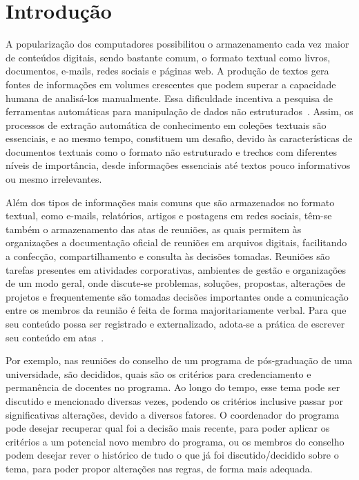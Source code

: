 \chapter{Introdução}\label{cap1}

\let\cleardoublepage\clearpage

A popularização dos computadores possibilitou o armazenamento cada vez maior de conteúdos digitais, sendo bastante comum, o formato textual como livros, documentos, e-mails, redes sociais e páginas web. A produção de textos gera fontes de informações em volumes crescentes que podem superar a capacidade humana de analisá-los manualmente. Essa dificuldade incentiva a pesquisa de ferramentas automáticas para manipulação de dados não estruturados~\cite{Cao:2017, Manning2008}. 
Assim, os processos de extração automática de conhecimento em coleções textuais são essenciais, e ao mesmo tempo, constituem um desafio, devido às características de documentos textuais como o formato não estruturado e trechos com diferentes níveis de importância, desde informações essenciais até textos pouco informativos ou mesmo irrelevantes. 

Além dos tipos de informações mais comuns que são armazenados no formato textual, como e-mails, relatórios, artigos e postagens em redes sociais, têm-se também o armazenamento das atas de reuniões, as quais permitem às organizações a documentação oficial de reuniões em arquivos digitais, facilitando a confecção, compartilhamento e consulta às decisões tomadas.
% 
% 
% 
Reuniões são tarefas presentes em atividades corporativas, ambientes de gestão e organizações de um modo geral, onde discute-se problemas, soluções, propostas, alterações de projetos e frequentemente são tomadas decisões importantes onde a comunicação entre os membros da reunião é feita de forma majoritariamente verbal. Para que seu conteúdo possa ser registrado e externalizado, adota-se a prática de escrever seu conteúdo em atas~\cite{Miriam2013, Lee2011}.

Por exemplo, nas reuniões do conselho de um programa de pós-graduação de uma universidade, são decididos, quais são os critérios para credenciamento e permanência de docentes no programa. Ao longo do tempo, esse tema pode ser discutido e mencionado diversas vezes, podendo os critérios inclusive passar por significativas alterações, devido a diversos fatores. O coordenador do programa pode desejar recuperar qual foi a decisão mais recente, para poder aplicar os critérios a um potencial novo membro do programa, ou os membros do conselho podem desejar rever o histórico de tudo o que já foi discutido/decidido sobre o tema, para poder propor alterações nas regras, de forma mais adequada.

